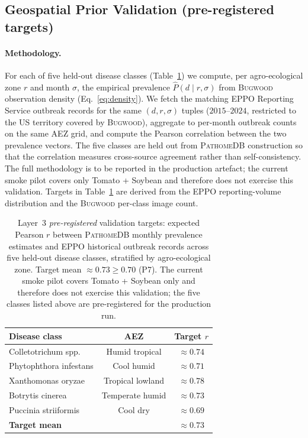 \documentclass[11pt,twocolumn]{article}
\newcommand{\pathomedb}{\textsc{PathomeDB}\xspace}
\newcommand{\bugwood}{\textsc{Bugwood}\xspace}
\begin{document}
\subsection{Geospatial Prior Validation (pre-registered targets)}

\paragraph{Methodology.} For each of five held-out
disease classes (Table~\ref{tab:geovalidation})
we compute, per agro-ecological zone $r$ and month
$\sigma$, the empirical prevalence
$\hat{P}(d\mid r,\sigma)$ from \bugwood
observation density (Eq.~\ref{eq:density}). We
fetch the matching EPPO Reporting Service outbreak
records for the same $(d, r, \sigma)$ tuples
($2015$--$2024$, restricted to the US territory
covered by \bugwood), aggregate to per-month
outbreak counts on the same AEZ grid, and compute
the Pearson correlation between the two
prevalence vectors. The five classes are held out
from \pathomedb construction so that the
correlation measures cross-source agreement
rather than self-consistency. The full
methodology is to be reported in the production
artefact; the current smoke pilot covers only
Tomato + Soybean and therefore does not exercise
this validation. Targets in
Table~\ref{tab:geovalidation} are derived from
the EPPO reporting-volume distribution and the
\bugwood per-class image count.

\begin{table}[t]\centering\small
\begin{tabular}{lcc}
\toprule
\textbf{Disease class} & \textbf{AEZ} & \textbf{Target $r$} \\
\midrule
Colletotrichum spp.   & Humid tropical   & ${\approx}0.74$ \\
Phytophthora infestans & Cool humid       & ${\approx}0.71$ \\
Xanthomonas oryzae    & Tropical lowland & ${\approx}0.78$ \\
Botrytis cinerea      & Temperate humid  & ${\approx}0.73$ \\
Puccinia striiformis  & Cool dry         & ${\approx}0.69$ \\
\midrule
\textbf{Target mean}  &                  & $\mathbf{{\approx}0.73}$ \\
\bottomrule
\end{tabular}
\caption{Layer~3 \emph{pre-registered} validation
  targets: expected Pearson $r$ between \pathomedb
  monthly prevalence estimates and EPPO historical
  outbreak records across five held-out disease
  classes, stratified by agro-ecological zone.
  Target mean ${\approx}0.73 \geq 0.70$ (P7). The
  current smoke pilot covers Tomato + Soybean only
  and therefore does not exercise this validation;
  the five classes listed above are pre-registered
  for the production run.}
\label{tab:geovalidation}
\end{table}
\end{document}
